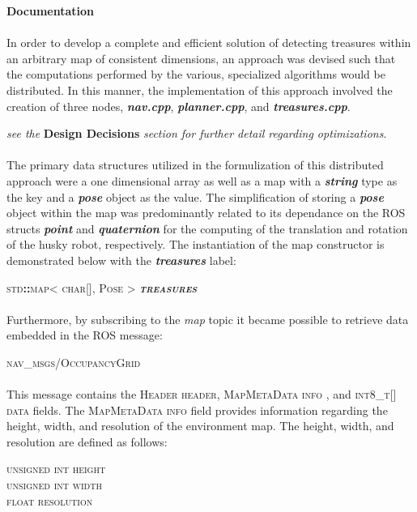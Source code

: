 \documentclass[12pt]{article}
\begin{document}
{\setlength{\parindent}{0cm}
\textbf{Documentation} \\
\paragraph{} In order to develop a complete and efficient solution of detecting treasures within an arbitrary map of consistent dimensions, an approach was devised such that the computations performed by the various, specialized algorithms would be distributed.
  In this manner, the implementation of this approach involved the creation of three nodes, \textbf{\textit{nav.cpp}}, \textbf{\textit{planner.cpp}}, and \textbf{\textit{treasures.cpp}}.
  \begin{center} \textit{see the} \textbf{Design Decisions} \textit{section for further detail regarding optimizations}. \end{center}
  \paragraph{} The primary data structures utilized in the formulization of this distributed approach were a one dimensional array as well as a map with a \textbf{\textit{string}} type as the key and a \textbf{\textit{pose}} object as the value.
  The simplification of storing a \textbf{\textit{pose}} object within the map was predominantly related to its dependance on the ROS structs \textit{\textbf{point}} and \textit{\textbf{quaternion}} for the computing of the translation and rotation of the husky robot, respectively.
  The instantiation of the map constructor is demonstrated below with the \textbf{\textit{treasures}} label:
  \begin{center} \textsc{std\textbf{::}map< char[], Pose > \textbf{\textit{treasures}}} \end{center}  
  \paragraph{} Furthermore, by subscribing to the \textit{map} topic it became possible to retrieve data embedded in the ROS message:
  \begin{center} \textsc{nav\_msgs/OccupancyGrid} \end{center}
  \paragraph{} This message contains the \textsc{Header header}, \textsc{MapMetaData info} , and \textsc{int}8\_\textsc{t}[] \textsc{data} fields. The \textsc{MapMetaData info} field provides information regarding the height, width, and resolution of the environment map.
  The height, width, and resolution are defined as follows:
  \begin{center} \textsc{unsigned int} \textsc{height} \\ \textsc{unsigned int} \textsc{width} \\ \textsc{float} \textsc{resolution} \end{center}
}
\end{document}
